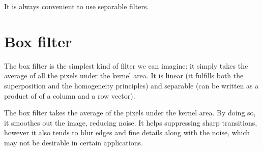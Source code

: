\documentclass{article}
\begin{document}
It is always convenient to use separable filters.

\section*{Box filter }

The box filter is the simplest kind of filter we can imagine: it simply takes the average of all the pixels under the kernel area. It is linear (it fulfills both the superposition and the homogeneity principles) and separable (can be written as a product of of a column and a row vector). 

The box filter takes the average of the pixels under the kernel area. By doing so, it smoothes out the image, reducing noise. It helps suppressing sharp transitions, however it also tends to blur edges and fine details along with the noise, which may not be desirable in certain applications.

\vspace{0.5cm}
\end{document}
